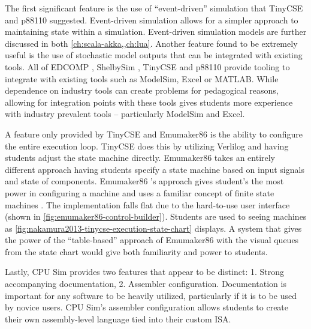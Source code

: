 The first significant feature is the use of ``event-driven'' simulation that TinyCSE \cite{Nakamura2013, McLoughlin2010} and p88110 \cite{Garcia2009} suggested. Event-driven simulation allows for a simpler approach to maintaining state within a simulation. Event-driven simulation models are further discussed in both \cref{ch:scala-akka,,ch:lua}. Another feature found to be extremely useful is the use of stochastic model outputs that can be integrated with existing tools. All of EDCOMP \cite{Djordjevic2005}, ShelbySim \cite{Tappan2009, Tappan2009-2}, TinyCSE \cite{Nakamura2013, McLoughlin2010} and p88110 \cite{Garcia2009} provide tooling to integrate with existing tools such as ModelSim, Excel or MATLAB. While dependence on industry tools can create problems for pedagogical reasons, allowing for integration points with these tools gives students more experience with industry prevalent tools -- particularly ModelSim and Excel. 

A feature only provided by TinyCSE \cite{Nakamura2013, McLoughlin2010} and Emumaker86 \cite{Black2013} is the ability to configure the entire execution loop. TinyCSE \cite{Nakamura2013,McLoughlin2010} does this by utilizing Verlilog and having students adjust the state machine directly. Emumaker86 \cite{Black2013} takes an entirely different approach having students specify a state machine based on input signals and state of components. Emumaker86 \cite{Black2013}'s approach gives student's the most power in configuring a machine and uses a familiar concept of finite state machines \cite{cec2016}. The implementation falls flat due to the hard-to-use user interface (shown in \cref{fig:emumaker86-control-builder}). Students are used to seeing machines as \cref{fig:nakamura2013-tinycse-execution-state-chart} displays. A system that gives the power of the ``table-based'' approach of Emumaker86 with the visual queues from the state chart would give both familiarity and power to students.

Lastly, CPU Sim \cite{Skrien2001} provides two features that appear to be distinct: 1. Strong accompanying documentation, 2. Assembler configuration. Documentation is important for any software to be heavily utilized, particularly if it is to be used by novice users. CPU Sim's assembler configuration allows students to create their own assembly-level language tied into their custom ISA.  
